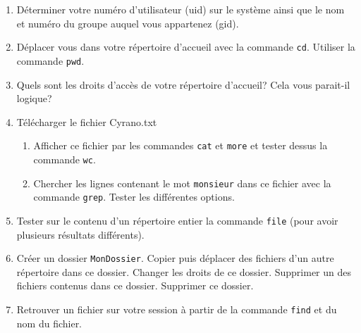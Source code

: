 \documentclass[a4paper,11pt]{exam}
\begin{document}


{
      \begin{enumerate}
	\item Déterminer votre numéro d’utilisateur (uid) sur le système ainsi que le nom et numéro du groupe auquel vous appartenez (gid).
	  \item Déplacer vous dans votre répertoire d’accueil avec la commande \texttt{cd}. Utiliser la commande \texttt{pwd}.
	  \item Quels sont les droits d'accès de votre répertoire d’accueil? Cela vous parait-il logique?
	  \item Télécharger le fichier Cyrano.txt
	    \begin{enumerate}
	    \item Afficher ce fichier par les commandes \texttt{cat} et \texttt{more} et tester dessus la commande \texttt{wc}.
	    \item Chercher les lignes contenant le mot \texttt{monsieur} dans ce fichier avec la commande \texttt{grep}. Tester les différentes options.
	    \end{enumerate}
	  \item Tester sur le contenu d'un répertoire entier la commande \texttt{file} (pour avoir plusieurs résultats différents).
	\item Créer un dossier \texttt{MonDossier}. Copier puis déplacer des fichiers d'un autre répertoire dans ce dossier. Changer les droits de ce dossier. Supprimer un des fichiers contenus dans ce dossier. Supprimer ce dossier.
	\item Retrouver un fichier sur votre session à partir de la commande \texttt{find} et du nom du fichier.

\end{enumerate}}
\end{document}
